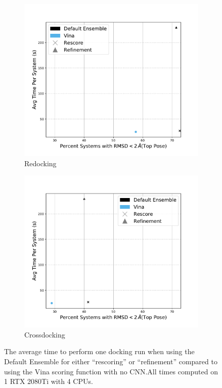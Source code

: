 \documentclass[journal=jcisd8,manuscript=article]{achemso}
\begin{document}
\begin{figure}    
        \begin{subfigure}[b]{0.48\textwidth}
               \centering
               \includegraphics[width=\textwidth]{figures/redocking/gpu_models_line_compare.pdf}
               \caption{Redocking}
               \label{fig:OptimalRescRD}
        \end{subfigure}    
        \begin{subfigure}[b]{0.48\textwidth}
               \centering
               \includegraphics[width=\textwidth]{figures/crossdocking/gpu_models_line_compare.pdf}
               \caption{Crossdocking}
               \label{fig:OptimalRescCD}
        \end{subfigure}    
        \caption{The average time to perform one docking run when using the Default Ensemble for either ``rescoring'' or ``refinement'' compared to using the Vina scoring function with no CNN.\@ All times computed on 1 RTX 2080Ti with 4 CPUs.}
        \label{fig:OptimalRescore}
\end{figure}    
\end{document}
